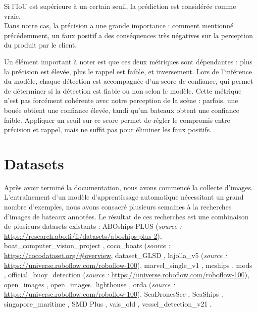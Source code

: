 Si l'IoU est supérieure à un certain seuil, la prédiction est considérée comme vraie.\\

Dans notre cas, la précision a une grande importance : comment mentionné précédemment,
un faux positif a des conséquences très négatives sur la perception du produit par le client.

Un élément important à noter est que ces deux métriques sont dépendantes : plus la précision est élevée,
plus le rappel est faible, et inversement. Lors de l'inférence du modèle, chaque détection est accompagnée
d'un score de confiance, qui permet de déterminer si la détection est fiable ou non
selon le modèle. Cette métrique n'est pas forcément cohérente avec notre perception 
de la scène : parfois, une bouée obtient une confiance élevée, tandi qu'un bateaux
obtent une confiance faible. Appliquer un seuil
sur ce score permet de régler le compromis entre précision et rappel, 
mais ne suffit pas pour éliminer les faux positifs.\\

\section{Datasets}

Après avoir terminé la documentation, nous avons commencé la collecte d'images.
L'entraînement d'un modèle d'apprentissage automatique nécessitant un grand nombre d'exemples,
nous avons consacré plusieurs semaines à la recherches d'images de bateaux annotées.
Le résultat de ces recherches est une combinaison de plusieurs datasets existants :
ABOships-PLUS (\textit{source : }\url{https://research.abo.fi/fi/datasets/aboships-plus-2}), 
boat\_computer\_vision\_project \cite{boat-detection-4tmst_dataset}, 
coco\_boats (\textit{source : }\url{https://cocodataset.org/#overview}, 
dataset\_GLSD \cite{Shao_Wang_Deng_Huang_Lu_Luo_Zhang_Lv_Dang_Ding_et al._2021}, 
lajolla\_v5 (\textit{source : }\url{https://universe.roboflow.com/roboflow-100}),
marvel\_single\_v1 \cite{MARVEL},
mcships \cite{Mcships2020},
mods \cite{Bovcon_Muhovic_Vranac_Mozetic_Pers_Kristan_2021},
official\_buoy\_detection (\textit{source : }\url{https://universe.roboflow.com/roboflow-100}),
open\_images \cite{OpenImages2}, 
open\_images\_lighthouse \cite{OpenImages2},
orda (\textit{source : }\url{https://universe.roboflow.com/roboflow-100}), 
SeaDronesSee \cite{varga2022seadronessee}, 
SeaShips \cite{shao2018seaships},
singapore\_maritime \cite{Prasad_Rajan_Rachmawati_Rajabaly_Quek_2016}, 
SMD Plus \cite{smd_plus}, 
vais\_old \cite{vais_old}, 
vessel\_detection\_v21 \cite{Matasci_Plante_Kasa_Mousavi_Stewart_Macdonald_Webster_Busler_2021}.


